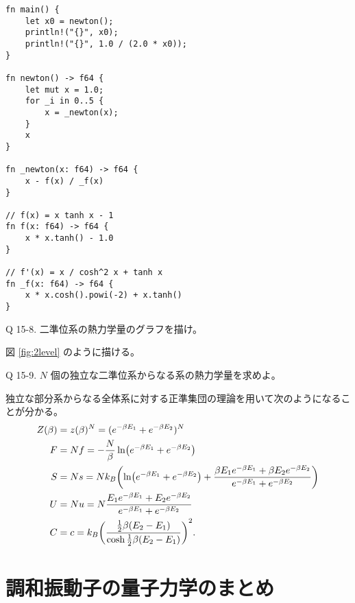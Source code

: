 \documentclass[uplatex,dvipdfmx,a4paper,11pt]{jlreq}
\theoremstyle{definition}
\begin{document}
\begin{lstlisting}[caption=Newton 法による,label=newton]
fn main() {
    let x0 = newton();
    println!("{}", x0);
    println!("{}", 1.0 / (2.0 * x0));
}

fn newton() -> f64 {
    let mut x = 1.0;
    for _i in 0..5 {
        x = _newton(x);
    }
    x
}

fn _newton(x: f64) -> f64 {
    x - f(x) / _f(x)
}

// f(x) = x tanh x - 1
fn f(x: f64) -> f64 {
    x * x.tanh() - 1.0
}

// f'(x) = x / cosh^2 x + tanh x
fn _f(x: f64) -> f64 {
    x * x.cosh().powi(-2) + x.tanh()
}
\end{lstlisting}

\begin{itembox}[l]{Q 15-8.}
  二準位系の熱力学量のグラフを描け。
\end{itembox}

図 \ref{fig:2level} のように描ける。



\begin{itembox}[l]{Q 15-9.}
  $N$ 個の独立な二準位系からなる系の熱力学量を求めよ。
\end{itembox}

独立な部分系からなる全体系に対する正準集団の理論を用いて次のようになることが分かる。
\begin{align}
  Z(\beta) & = z(\beta)^N = (e^{-\beta E_1} + e^{-\beta E_2})^N                                                                                                \\
  F        & = Nf = -\frac{N}{\beta}\ln(e^{-\beta E_1} + e^{-\beta E_2})                                                                                       \\
  S        & = Ns = Nk_B\qty(\ln(e^{-\beta E_1} + e^{-\beta E_2}) + \frac{\beta E_1e^{-\beta E_1} + \beta E_2e^{-\beta E_2}}{e^{-\beta E_1} + e^{-\beta E_2}}) \\
  U        & = Nu = N\frac{E_1e^{-\beta E_1} + E_2e^{-\beta E_2}}{e^{-\beta E_1} + e^{-\beta E_2}}                                                             \\
  C        & = c = k_B\qty(\frac{\frac{1}{2}\beta(E_2 - E_1)}{\cosh\frac{1}{2}\beta(E_2 - E_1)})^2.
\end{align}

\section{調和振動子の量子力学のまとめ}
\end{document}
